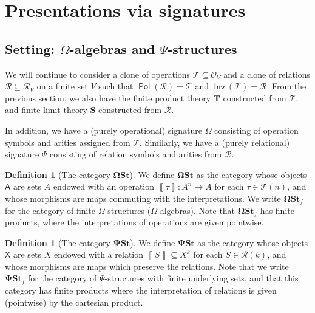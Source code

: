 \documentclass[11pt, a4paper, twoside,leqno]{amsart}
\newcommand{\cat}[1]{\mathbf{#1}}
\newcommand{\dbr}[1]{\left\llbracket{#1}\right\rrbracket}
\renewcommand{\O}{{\mathcal O}}
\newcommand{\R}{{\mathcal R}}
\numberwithin{equation}{section}
\theoremstyle{plain}
\theoremstyle{definition}
\newtheorem{Defn}[Thm]{Definition}
\DeclareMathOperator{\Pol}{\mathsf{Pol}}
\DeclareMathOperator{\Inv}{\mathsf{Inv}}
\begin{document}
\section{Presentations via signatures}
\label{sec:via-sig-structures}


\subsection{Setting: \(\Omega\)-algebras and \(\Psi\)-structures}
\label{sec:sig-setting}


We will continue to consider a clone of operations \(\mathscr{T}
\subseteq \O_{V}\) and a clone of
relations \(\mathscr{R}
\subseteq \R_{V}\) on a finite set \(V\) such that  \(\Pol(\mathscr{R}
) = \mathscr{T}
\) and \(\Inv(\mathscr{T}
) = \mathscr{R}
\). From the previous section, we also have the finite product theory
\(\cat{T}\) constructed from \(\mathscr{T}
\), and finite limit theory \(\cat{S}\) constructed from \(\mathscr{R}\).

In addition, we have a (purely operational) signature \(\Omega\) consisting of
operation symbols and arities assigned from \(\mathscr{T}
\). Similarly, we have a (purely relational) signature \(\Psi\) consisting of
relation symbols and arities from \(\mathscr{R}
\). 

\begin{Defn}[The category \(\cat{\Omega St}\)]
  \label{def:Om-str}
  We define $\cat{\Omega St}$ as the category whose objects \(\mathsf{A}\) are
  sets \(A\) endowed with an operation
  \(\dbr{\tau} \colon A^{n} \rightarrow A\) for each \(\tau\in \mathscr{T}(n)\), and whose
  morphisms are maps commuting with the interpretations. We write
  \(\cat{\Omega St}_{f}\) for the category of finite
  \(\Omega\)-structures (\(\Omega\)-algebras). Note that \(\cat{\Omega St}_{f}\)
  has finite products, where the interpretations of operations are
  given pointwise.
\end{Defn}

\begin{Defn}[The category \(\cat{\Psi St}\)]
  \label{def:psi-str}
  We define \(\cat{\Psi St}\) as the category whose objects \(\mathsf{X}\) are
  sets \(X\) endowed with a relation \(\dbr{S} \subseteq X^{k}\) for each
  \(S\in \mathscr{R}(k)
  \), and whose morphisms are maps which preserve the
  relations. Note that we write \(\cat{\Psi St}_{f}\) for the category
  of \(\Psi\)-structures with finite underlying sets, and that this
  category has finite products where the
  interpretation of relations is given (pointwise) by the cartesian product.
\end{Defn}
\end{document}
